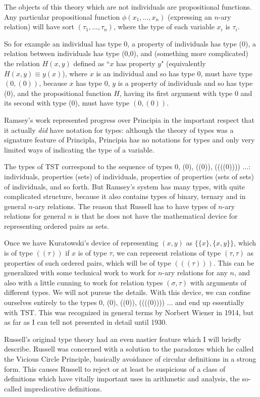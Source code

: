 \documentclass[12pt]{article}
\begin{document}
The objects of this theory which are not individuals are propositional functions.  Any particular propositional function $\phi(x_1,\ldots,x_n)$ (expressing an $n$-ary relation)
will have sort $(\tau_1,\ldots,\tau_n)$, where the type of each variable $x_i$ is $\tau_i$.

So for example an individual has type 0, a property of individuals has type (0), a relation between individuals has type (0,0), and (something more complicated)
the relation $H(x,y)$ defined as ``$x$ has property $y$" (equivalently $H(x,y) \equiv y(x)$), where $x$ is an individual and so has type 0, must have type $(0,(0))$, because $x$ has type 0, $y$ is a property
of individuals and so has type (0), and the propositional function $H$, having its first argument with type 0 and its second with type (0), must have type $(0,(0))$.

Ramsey's work represented progress over Principia in the important respect that it actually {\em did\/} have notation for types:  although the theory of types was a signature
feature of Principla, Principia has no notations for types and only very limited ways of indicating the type of a variable.

The types of TST correspond to the sequence of types 0, (0), ((0)), ((((0)))) $\ldots$:  individuals, properties (sets) of individuals, properties of properties (sets of sets) of individuals, and so forth.  But Ramsey's system has many types, with quite complicated structure, because it also contains types of binary, ternary and in general $n$-ary relations.  The reason that
Russell has to have types of $n$-ary relations for general $n$ is that he does not have the mathematical device for representing ordered pairs as sets.

Once we have Kuratowski's device of representing $(x,y)$ as $\{\{x\},\{x,y\}\}$, which is of type $((\tau))$ if $x$ is of type $\tau$, we can represent relations of
type $(\tau,\tau)$ as properties of such ordered pairs, which will be of type $(((\tau)))$.  This can be generalized with some technical work to work for $n$-ary relations for any
$n$, and also with a little cunning to work for relation types $(\sigma,\tau)$ with arguments of different types.  We will not pursue the details.  With this device, we can confine ourselves
entirely to the types  0, (0), ((0)), ((((0)))) $\ldots$ and end up essentially with TST.  This was recognized in general terms by Norbert Wiener in 1914, but as far as I can tell not presented
in detail until 1930.

Russell's original type theory had an even nastier feature which I will briefly describe.  Russell was concerned with a solution to the paradoxes which he called the Vicious Circle Principle,
basically avoidance of circular definitions in a strong form.  This causes Russell to reject or at least be suspicious of a class of definitions which have vitally important uses in arithmetic and analysis, the so-called impredicative definitions.
\end{document}
